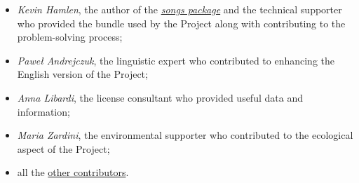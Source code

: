 \begin{itemize}
	\item {\textit{\rmfamily Kevin Hamlen}}, the author of the \href{http://songs.sourceforge.net/}{\textit{songs package}} and the technical supporter who provided the bundle used by the Project along with contributing to the problem-solving process;
	\item {\textit{\rmfamily Paweł Andrejczuk}}, the linguistic expert who contributed to enhancing the English version of the Project;
	\item {\textit{\rmfamily Anna Libardi}}, the license consultant who provided useful data and information;
	\item {\textit{\rmfamily Maria Zardini}}, the environmental supporter who contributed to the ecological aspect of the Project;
  \item all the \href{https://github.com/PietroPrandini/GuitarHub/graphs/contributors}{other contributors}.
\end{itemize}
